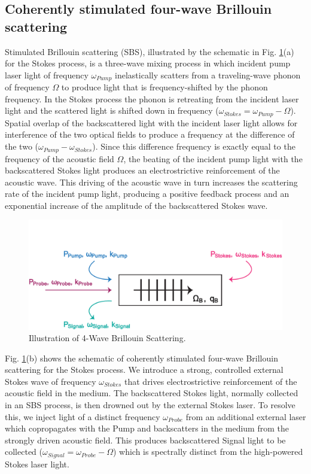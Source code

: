 \documentclass[%
  reprint,
  superscriptaddress,
  amsmath,amssymb,
  aps,
  prapplied,
]{revtex4-2}
\begin{document}
\subsection*{Coherently stimulated four-wave Brillouin scattering}
\label{Theoretical Framework:Coherently stimulated five-wave Brillouin scattering}
Stimulated Brillouin scattering (SBS), illustrated by the schematic in Fig. \ref{fig:4-Wave-Brillouin-Scattering}(a) for the Stokes process, is a three-wave mixing process in which incident pump laser light of frequency $\omega_{Pump}$ inelastically scatters from a traveling-wave phonon of frequency $\Omega$ to produce light that is frequency-shifted by the phonon frequency. In the Stokes process the phonon is retreating from the incident laser light and the scattered light is shifted down in frequency ($\omega_{Stokes} = \omega_{Pump} - \Omega$). Spatial overlap of the backscattered light with the incident laser light allows for interference of the two optical fields to produce a frequency at the difference of the two ($\omega_{Pump} - \omega_{Stokes}$). Since this difference frequency is exactly equal to the frequency of the acoustic field $\Omega$, the beating of the incident pump light with the backscattered Stokes light produces an electrostrictive reinforcement of the acoustic wave. This driving of the acoustic wave in turn increases the scattering rate of the incident pump light, producing a positive feedback process and an exponential increase of the amplitude of the backscattered Stokes wave.

\begin{figure}[t]
  \centering
  \includegraphics[width=.5\textwidth]{4-Wave-Brillouin-Scattering.pdf}
  \caption{Illustration of 4-Wave Brillouin Scattering.}
  \label{fig:4-Wave-Brillouin-Scattering}
\end{figure}

Fig. \ref{fig:4-Wave-Brillouin-Scattering}(b) shows the schematic of coherently stimulated four-wave Brillouin scattering for the Stokes process. We introduce a strong, controlled external Stokes wave of frequency $\omega_{Stokes}$ that drives electrostrictive reinforcement of the acoustic field in the medium. The backscattered Stokes light, normally collected in an SBS process, is then drowned out by the external Stokes laser. To resolve this, we inject light of a distinct frequency $\omega_{Probe}$ from an additional external laser which copropagates with the Pump and backscatters in the medium from the strongly driven acoustic field. This produces backscattered Signal light to be collected ($\omega_{Signal} = \omega_{Probe} - \Omega$) which is spectrally distinct from the high-powered Stokes laser light.
\end{document}
